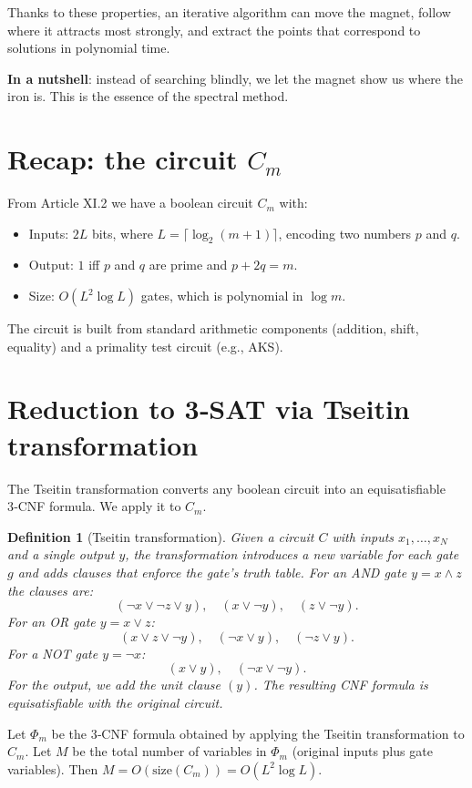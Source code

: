 \documentclass[11pt,a4paper]{article}
\newtheorem{definition}[theorem]{Definition}
\begin{document}
Thanks to these properties, an iterative algorithm can move the magnet, follow where it attracts most strongly, and extract the points that correspond to solutions in polynomial time.

\textbf{In a nutshell}: instead of searching blindly, we let the magnet show us where the iron is. This is the essence of the spectral method.

\section{Recap: the circuit \(C_m\)}

From Article XI.2 we have a boolean circuit \(C_m\) with:
\begin{itemize}
\item Inputs: \(2L\) bits, where \(L = \lceil \log_2(m+1)\rceil\), encoding two numbers \(p\) and \(q\).
\item Output: \(1\) iff \(p\) and \(q\) are prime and \(p+2q=m\).
\item Size: \(O(L^2 \log L)\) gates, which is polynomial in \(\log m\).
\end{itemize}
The circuit is built from standard arithmetic components (addition, shift, equality) and a primality test circuit (e.g., AKS).

\section{Reduction to 3‑SAT via Tseitin transformation}

The Tseitin transformation converts any boolean circuit into an equisatisfiable 3‑CNF formula. We apply it to \(C_m\).

\begin{definition}[Tseitin transformation]
Given a circuit \(C\) with inputs \(x_1,\dots,x_N\) and a single output \(y\), the transformation introduces a new variable for each gate \(g\) and adds clauses that enforce the gate’s truth table. For an AND gate \(y = x \land z\) the clauses are:
\[
(\neg x \lor \neg z \lor y),\quad (x \lor \neg y),\quad (z \lor \neg y).
\]
For an OR gate \(y = x \lor z\):
\[
(x \lor z \lor \neg y),\quad (\neg x \lor y),\quad (\neg z \lor y).
\]
For a NOT gate \(y = \neg x\):
\[
(x \lor y),\quad (\neg x \lor \neg y).
\]
For the output, we add the unit clause \((y)\). The resulting CNF formula is equisatisfiable with the original circuit.
\end{definition}

Let \(\Phi_m\) be the 3‑CNF formula obtained by applying the Tseitin transformation to \(C_m\). Let \(M\) be the total number of variables in \(\Phi_m\) (original inputs plus gate variables). Then \(M = O(\text{size}(C_m)) = O(L^2 \log L)\).
\end{document}
